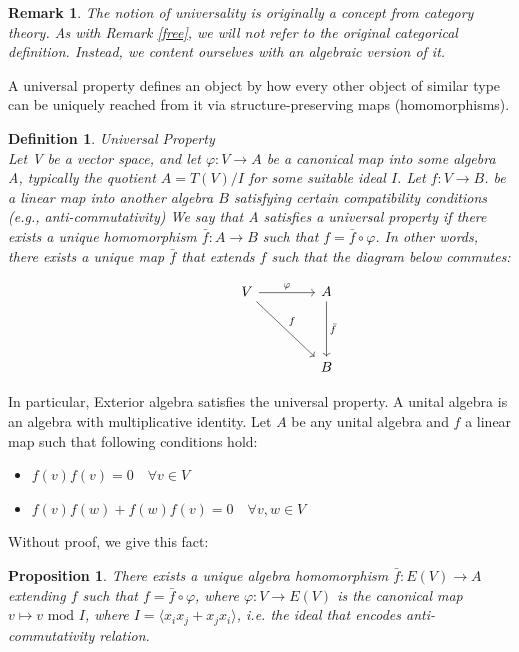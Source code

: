 \documentclass[12pt]{article}
\newtheorem{proposition}[theorem]{Proposition}
\newtheorem{definition}[theorem]{Definition}
\newtheorem{remark}[theorem]{Remark}
\numberwithin{theorem}{section}
\numberwithin{equation}{theorem}
\begin{document}
\begin{remark}
The notion of universality is originally a concept from category theory. As with Remark \ref{free}, we will not refer to the original categorical definition. Instead, we content ourselves with an algebraic version of it.
\end{remark}

A universal property defines an object by how every other object of similar type can be uniquely reached from it via structure-preserving maps (homomorphisms).

\begin{definition} Universal Property \\
Let V be a vector space, and let $\varphi : V \to A$ be a canonical map into some algebra A, typically the quotient $A = T(V)/I$ for some suitable ideal $I$. Let $f : V \to B$. be a linear map into another algebra $B$ satisfying certain compatibility conditions (e.g., anti-commutativity) We say that A satisfies a universal property if there exists a unique homomorphism $\bar{f} : A \to B$ such that $f = \bar{f} \circ \varphi$. In other words, there exists a unique map $\bar{f}$ that extends $f$ such that the diagram below commutes:

$$
\begin{tikzcd}[row sep = 4em, column sep = 4em]
& V \arrow{r}{\varphi} \arrow{dr}{f} & A \arrow{d}{\bar{f}} \\ & & B
\end{tikzcd}
$$
\end{definition}

In particular, Exterior algebra satisfies the universal property. A unital algebra is an algebra with multiplicative identity. Let $A$ be any unital algebra and $f$ a linear map such that following conditions hold:

\begin{itemize}
    \item $f(v)f(v) = 0 \quad \forall v \in V$
    \item $f(v)f(w) + f(w)f(v) = 0 \quad \forall v, w \in V$
\end{itemize}
Without proof, we give this fact:

\begin{proposition}
    There exists a unique algebra homomorphism $\bar{f} : E(V) \longrightarrow A$ extending $f$ such that $f = \bar{f} \circ \varphi$, where $\varphi : V \longrightarrow E(V)$ is the canonical map $v \mapsto v \text{ mod } I$, where $I = \langle x_ix_j + x_jx_i \rangle$, i.e. the ideal that encodes anti-commutativity relation.
\end{proposition}
\end{document}
